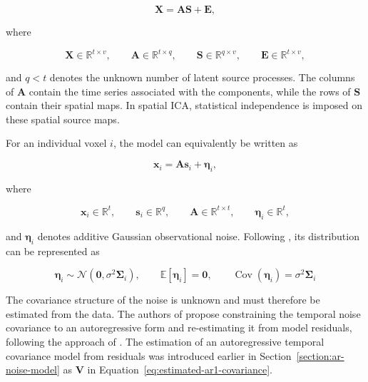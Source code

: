 \documentclass[english]{pwr_wmat_praca_dyplomowa}
\theoremstyle{definition}
\theoremstyle{remark}
\begin{document}
\begin{equation}
    \mathbf{X} = \mathbf{A}\mathbf{S} + \mathbf{E},
    \label{eq:pica-model}
\end{equation}

where

\begin{equation}
    \mathbf{X} \in \mathbb{R}^{t\times v},
    \qquad \mathbf{A} \in \mathbb{R}^{t\times q},
    \qquad \mathbf{S} \in \mathbb{R}^{q\times v},
    \qquad \mathbf{E} \in \mathbb{R}^{t\times v},
    \label{eq:pica-dimensions}
\end{equation}

and $q<t$ denotes the unknown number of latent source processes. The columns of $\mathbf{A}$ contain the time series associated with the components, while the rows of $\mathbf{S}$ contain their spatial maps. In spatial ICA, statistical independence is imposed on these spatial source maps.

For an individual voxel $i$, the model can equivalently be written as

\begin{equation}
    \mathbf{x}_i = \mathbf{A}\mathbf{s}_i + \boldsymbol{\eta}_i,
    \label{eq:pica-not-whitened}
\end{equation}

where

\begin{equation}
    \mathbf{x}_i \in \mathbb{R}^{t}, \qquad 
    \mathbf{s}_i \in \mathbb{R}^{q}, \qquad 
    \mathbf{A} \in \mathbb{R}^{t\times t}, \qquad
    \boldsymbol{\eta}_i \in \mathbb{R}^t,
\end{equation}

and $\boldsymbol{\eta}_i$ denotes additive Gaussian observational noise. Following \cite{pica}, its distribution can be represented as

\begin{equation}
    \boldsymbol{\eta}_i \sim \mathcal{N}\left(\mathbf{0}, \sigma^2\boldsymbol{\Sigma}_i\right), 
    \qquad \mathbb{E} \left[\boldsymbol{\eta}_i\right] = \mathbf{0},
    \qquad \operatorname{Cov} (\boldsymbol{\eta}_i) = \sigma^2\boldsymbol{\Sigma}_i
\end{equation}

The covariance structure of the noise is unknown and must therefore be estimated from the data. The authors of \cite{pica} propose constraining the temporal noise covariance to an autoregressive form and re-estimating it from model residuals, following the approach of \cite{woolrich-temporal-autocorrelation}. The estimation of an autoregressive temporal covariance model from residuals was introduced earlier in Section~\ref{section:ar-noise-model} as $\mathbf{V}$ in Equation~\eqref{eq:estimated-ar1-covariance}.
\end{document}
